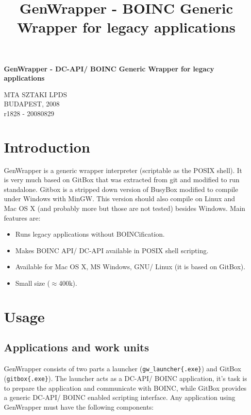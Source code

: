 \documentclass[a4paper,12pt,titlepage,dvipdfm]{article}
\title{GenWrapper - BOINC Generic Wrapper for legacy applications}
\begin{document}
\begin{center}
    \vspace*{20mm}
	\LARGE{\textbf{GenWrapper - DC-API/ BOINC Generic Wrapper for legacy applications}}
	\vfill
\end{center}
\begin{center}
    \vspace{30mm}
    \Large{MTA SZTAKI LPDS}\\
    \vspace{10mm}
    \large{BUDAPEST, 2008}\\
    \vspace{100mm}
    \small{r1828 - 20080829}
\end{center}
\thispagestyle{empty}

\pagebreak
\tableofcontents

\pagebreak
          

\section{Introduction}

GenWrapper is a generic wrapper interpreter (scriptable as the POSIX shell). It is very much based on GitBox that was extracted from git and modified to run
standalone. Gitbox is a stripped down version of BusyBox modified to compile under Windows with MinGW. This version should also compile on Linux and Mac OS X (and probably more but those are not tested) besides Windows. Main features are:

\begin{itemize}
    \item Runs legacy applications without BOINCification.
    \item Makes BOINC API/ DC-API available in POSIX shell scripting.
    \item Available for Mac OS X, MS Windows, GNU/ Linux (it is based on GitBox).
    \item Small size (\(\approx\)400k).
\end{itemize}

\section{Usage}

\subsection{Applications and work units}

\paragraph*{} GenWrapper consists of two parts a launcher (\texttt{gw\_launcher\{.exe\}}) and GitBox (\texttt{gitbox\{.exe\}}). The launcher acts as a DC-API/ BOINC application, it's task is to prepare the application and communicate with BOINC, while GitBox provides a generic DC-API/ BOINC enabled scripting interface. Any application using GenWrapper must have the following components:
\end{document}
